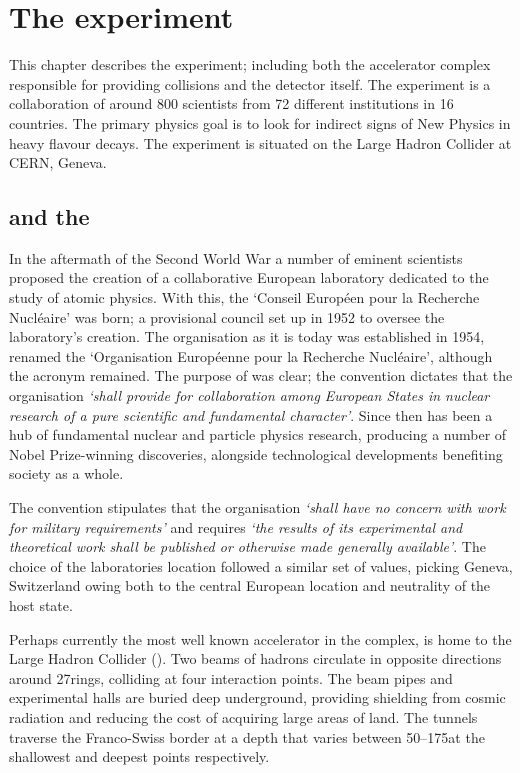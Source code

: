\chapter{The \lhcb experiment} 
\label{ch:detector}
\minitoc


This chapter describes the \lhcb experiment; including both the accelerator complex responsible for providing \proton\proton collisions and the \lhcb detector itself.  
The \lhcb experiment is a collaboration of around 800 scientists from 72 different institutions in 16 countries. The primary physics goal is to look for indirect signs of New Physics in heavy flavour decays. The experiment is situated on the Large Hadron Collider at CERN, Geneva. 



\section{\cern and the \lhc}


In the aftermath of the Second World War a number of eminent scientists proposed the creation of a collaborative European laboratory dedicated to the study of atomic physics. With this, the `Conseil Europ\'een pour la Recherche Nucl\'eaire' was born; a provisional council set up in 1952 to oversee the laboratory's creation.  The organisation as it is today was established in 1954, renamed the `Organisation Europ\'eenne pour la Recherche Nucl\'eaire', although the acronym \cern remained. 
The purpose of \cern was clear; the convention dictates that the organisation \emph{`shall provide for collaboration among European States in nuclear research of a pure scientific and fundamental character'}.
Since then \cern has been a hub of fundamental nuclear and particle physics research, producing a number of Nobel Prize-winning discoveries, alongside technological developments benefiting society as a whole.

The convention stipulates that the organisation \emph{`shall have no concern with work for military requirements'} and  
requires \emph{`the results of its experimental and theoretical work shall be published or otherwise made generally available'}. 
The choice of the laboratories location followed a similar set of values, picking Geneva, Switzerland owing both to the central European location and neutrality of the host state. 


Perhaps currently the most well known accelerator in the complex, \cern is home to the Large Hadron Collider (\lhc). Two beams of hadrons circulate in opposite directions around 27\km rings, colliding at four interaction points. The beam pipes and experimental halls are buried deep underground, providing shielding from cosmic radiation and reducing the cost of acquiring large areas of land. The tunnels traverse the Franco-Swiss border at a depth that varies between 50--175\m at the shallowest and deepest points respectively.      


